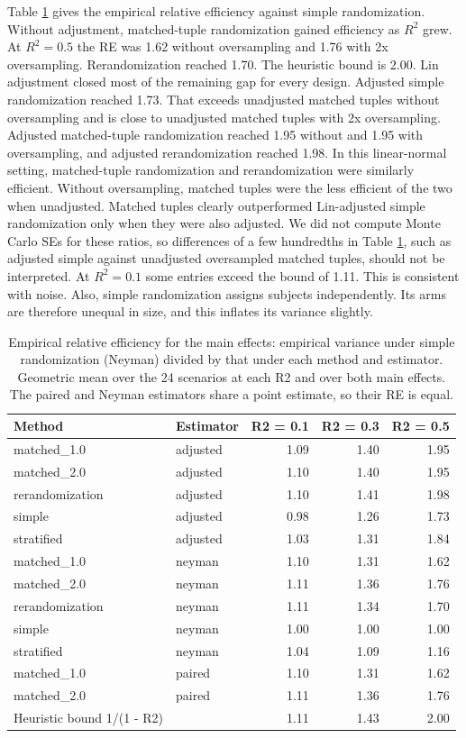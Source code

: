 \documentclass[
  11pt,
]{article}
\begin{document}
Table \ref{tab:re-table} gives the empirical relative
efficiency against simple randomization. Without
adjustment, matched-tuple randomization gained efficiency
as \(R^2\) grew. At \(R^2 = 0.5\) the RE was
1.62 without oversampling
and 1.76 with 2x
oversampling. Rerandomization reached
1.70. The heuristic
bound is 2.00. Lin adjustment closed most of the remaining
gap for every design. Adjusted simple randomization reached
1.73. That exceeds unadjusted
matched tuples without oversampling and is close to
unadjusted matched tuples with 2x oversampling. Adjusted
matched-tuple randomization reached
1.95 without and
1.95 with oversampling,
and adjusted rerandomization reached
1.98. In this
linear-normal setting, matched-tuple randomization and
rerandomization were similarly efficient. Without
oversampling, matched tuples were the less efficient of the
two when unadjusted. Matched tuples clearly outperformed
Lin-adjusted simple randomization only when they were also
adjusted. We did not compute Monte Carlo SEs for these
ratios, so differences of a few hundredths in Table
\ref{tab:re-table}, such as adjusted simple against
unadjusted oversampled matched tuples, should not be
interpreted.
At \(R^2 = 0.1\) some entries exceed the bound of 1.11. This
is consistent with noise. Also, simple randomization
assigns subjects independently. Its arms are therefore
unequal in size, and this inflates its variance slightly.

\begin{table}[!h]
\centering
\caption{\label{tab:re-table}Empirical relative efficiency for the main effects: empirical variance under simple randomization (Neyman) divided by that under each method and estimator. Geometric mean over the 24 scenarios at each R2 and over both main effects. The paired and Neyman estimators share a point estimate, so their RE is equal.}
\centering
\fontsize{9}{11}\selectfont
\begin{tabular}[t]{llrrr}
\toprule
Method & Estimator & R2 = 0.1 & R2 = 0.3 & R2 = 0.5\\
\midrule
matched\_1.0 & adjusted & 1.09 & 1.40 & 1.95\\
matched\_2.0 & adjusted & 1.10 & 1.40 & 1.95\\
rerandomization & adjusted & 1.10 & 1.41 & 1.98\\
simple & adjusted & 0.98 & 1.26 & 1.73\\
stratified & adjusted & 1.03 & 1.31 & 1.84\\
\addlinespace
matched\_1.0 & neyman & 1.10 & 1.31 & 1.62\\
matched\_2.0 & neyman & 1.11 & 1.36 & 1.76\\
rerandomization & neyman & 1.11 & 1.34 & 1.70\\
simple & neyman & 1.00 & 1.00 & 1.00\\
stratified & neyman & 1.04 & 1.09 & 1.16\\
\addlinespace
matched\_1.0 & paired & 1.10 & 1.31 & 1.62\\
matched\_2.0 & paired & 1.11 & 1.36 & 1.76\\
Heuristic bound 1/(1 - R2) &  & 1.11 & 1.43 & 2.00\\
\bottomrule
\end{tabular}
\end{table}
\end{document}

